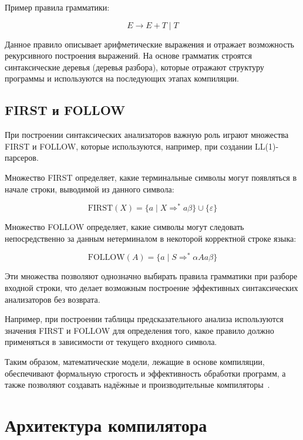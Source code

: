 \documentclass[coursework]{SCWorks}
\begin{document}
Пример правила грамматики:

\begin{equation}
E \rightarrow E + T \mid T
\end{equation}

Данное правило описывает арифметические выражения и отражает возможность рекурсивного построения выражений. 
На основе грамматик строятся синтаксические деревья (деревья разбора), которые отражают структуру программы 
и используются на последующих этапах компиляции.

\subsection{FIRST и FOLLOW}

При построении синтаксических анализаторов важную роль играют множества FIRST и FOLLOW, 
которые используются, например, при создании LL(1)-парсеров.

Множество FIRST определяет, какие терминальные символы могут появляться в начале строки, 
выводимой из данного символа:

\begin{equation}
\text{FIRST}(X) = \{ a \mid X \Rightarrow^* a\beta \} \cup \{\varepsilon\}
\end{equation}

Множество FOLLOW определяет, какие символы могут следовать непосредственно за данным нетерминалом 
в некоторой корректной строке языка:

\begin{equation}
\text{FOLLOW}(A) = \{ a \mid S \Rightarrow^* \alpha A a \beta \}
\end{equation}

Эти множества позволяют однозначно выбирать правила грамматики при разборе входной строки, 
что делает возможным построение эффективных синтаксических анализаторов без возврата.

Например, при построении таблицы предсказательного анализа используются значения FIRST и FOLLOW 
для определения того, какое правило должно применяться в зависимости от текущего входного символа.

Таким образом, математические модели, лежащие в основе компиляции, обеспечивают формальную строгость 
и эффективность обработки программ, а также позволяют создавать надёжные и производительные компиляторы~\cite{grune2012parsing}.

\section{Архитектура компилятора}
\end{document}
